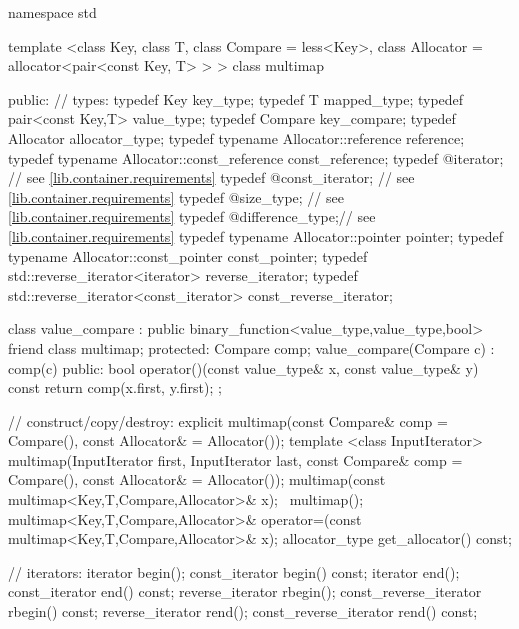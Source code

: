 \begin{codeblock}
namespace std {
  template <class Key, class T, class Compare = less<Key>,
            class Allocator = allocator<pair<const Key, T> > >
  class multimap {
  public:
    // types:
    typedef Key                                   key_type;
    typedef T                                     mapped_type;
    typedef pair<const Key,T>                     value_type;
    typedef Compare                               key_compare;
    typedef Allocator                             allocator_type;
    typedef typename Allocator::reference         reference;
    typedef typename Allocator::const_reference   const_reference;
    typedef @\impdef@                iterator;       // see \ref{lib.container.requirements}
    typedef @\impdef@                const_iterator; // see \ref{lib.container.requirements}
    typedef @\impdef@                size_type;      // see \ref{lib.container.requirements}
    typedef @\impdef@                difference_type;// see \ref{lib.container.requirements}
    typedef typename Allocator::pointer           pointer;
    typedef typename Allocator::const_pointer     const_pointer;
    typedef std::reverse_iterator<iterator>       reverse_iterator;
    typedef std::reverse_iterator<const_iterator> const_reverse_iterator;

    class value_compare
      : public binary_function<value_type,value_type,bool> {
    friend class multimap;
    protected:
      Compare comp;
      value_compare(Compare c) : comp(c) {}
    public:
      bool operator()(const value_type& x, const value_type& y) const {
        return comp(x.first, y.first);
      }
    };

    // construct/copy/destroy:
    explicit multimap(const Compare& comp = Compare(),
                      const Allocator& = Allocator());
    template <class InputIterator>
      multimap(InputIterator first, InputIterator last,
               const Compare& comp = Compare(),
               const Allocator& = Allocator());
    multimap(const multimap<Key,T,Compare,Allocator>& x);
   ~multimap();
    multimap<Key,T,Compare,Allocator>&
      operator=(const multimap<Key,T,Compare,Allocator>& x);
    allocator_type get_allocator() const;

    // iterators:
    iterator               begin();
    const_iterator         begin() const;
    iterator               end();
    const_iterator         end() const;
    reverse_iterator       rbegin();
    const_reverse_iterator rbegin() const;
    reverse_iterator       rend();
    const_reverse_iterator rend() const;

}}
\end{codeblock}
